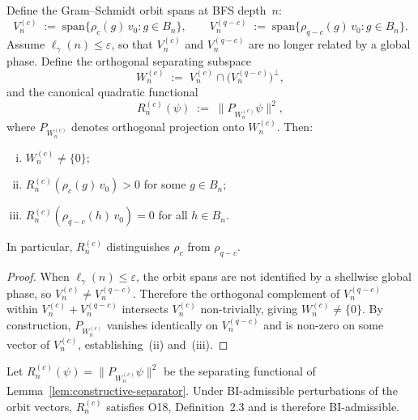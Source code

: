     \begin{lemma}
      \label{lem:constructive-separator}
      Define the Gram--Schmidt orbit spans at BFS depth~$n$:
      \begin{equation}
        V_n^{(c)} \;:=\; \mathrm{span}\{\rho_c(g)\,v_0 : g \in B_n\},
        \qquad
        V_n^{(q-c)} \;:=\; \mathrm{span}\{\rho_{q-c}(g)\,v_0 : g \in B_n\}.
      \end{equation}
      Assume $\ell_\gamma(n) \leq \varepsilon$, so that $V_n^{(c)}$ and
      $V_n^{(q-c)}$ are no longer related by a global phase.
      Define the orthogonal separating subspace
      \begin{equation}
        W_n^{(c)} \;:=\; V_n^{(c)} \cap \bigl(V_n^{(q-c)}\bigr)^\perp,
      \end{equation}
      and the canonical quadratic functional
      \begin{equation}
        R_n^{(c)}(\psi) \;:=\; \|P_{W_n^{(c)}}\psi\|^2,
      \end{equation}
      where $P_{W_n^{(c)}}$ denotes orthogonal projection onto $W_n^{(c)}$.
      Then:
      \begin{enumerate}[(i)]
  \item $W_n^{(c)} \neq \{0\}$;
  \item $R_n^{(c)}(\rho_c(g)\,v_0) > 0$ for some $g \in B_n$;
  \item $R_n^{(c)}(\rho_{q-c}(h)\,v_0) = 0$ for all $h \in B_n$.
      \end{enumerate}
      In particular, $R_n^{(c)}$ distinguishes $\rho_c$ from $\rho_{q-c}$.
    \end{lemma}

    \begin{proof}
      When $\ell_\gamma(n) \leq \varepsilon$, the orbit spans are not identified
      by a shellwise global phase, so $V_n^{(c)} \neq V_n^{(q-c)}$.
      Therefore the orthogonal complement of $V_n^{(q-c)}$ within
      $V_n^{(c)} + V_n^{(q-c)}$ intersects $V_n^{(c)}$ non-trivially,
      giving $W_n^{(c)} \neq \{0\}$.
      By construction, $P_{W_n^{(c)}}$ vanishes identically on $V_n^{(q-c)}$
      and is non-zero on some vector of $V_n^{(c)}$, establishing~(ii) and~(iii).
    \end{proof}

    \begin{proposition}
      \label{prop:bi-admissibility-R}
      Let $R_n^{(c)}(\psi) = \|P_{W_n^{(c)}}\psi\|^2$ be the separating functional
      of Lemma~\ref{lem:constructive-separator}.
      Under BI-admissible perturbations of the orbit vectors, $R_n^{(c)}$
      satisfies O18, Definition~2.3 and is therefore BI-admissible.
    \end{proposition}

